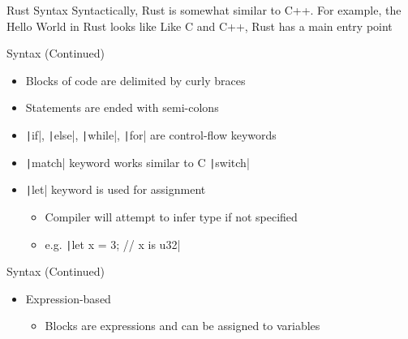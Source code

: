 \begin{frame}{Rust Syntax}
    \pause
    Syntactically, Rust is somewhat similar to C++. For example, the Hello World
    in Rust looks like
    \pause
    \pause
    Like C and C++, Rust has a \alert{main} entry point
\end{frame}

\begin{frame}{Syntax (Continued)}
    \begin{itemize}[<+->]
        \item Blocks of code are delimited by curly braces
        \item \alert{Statements} are ended with semi-colons
        \item \texttt|if|, \texttt|else|,
        \texttt|while|, \texttt|for| are control-flow
        keywords
        \item \texttt|match| keyword works similar to C 
              \texttt|switch|
        \item \texttt|let| keyword is used for assignment
        \begin{itemize}[<+->]
            \item Compiler will attempt to infer type if not specified
            \item e.g. \texttt|let x = 3; // x is u32|
        \end{itemize}
    \end{itemize}
\end{frame}

\begin{frame}{Syntax (Continued)}
    \pause
    \begin{itemize}[<+->]
        \item Expression-based
        \begin{itemize}[<+->]
            \item Blocks are expressions and can be assigned to variables
            \pause{}\pause
        \end{itemize}
    \end{itemize}
\end{frame}

